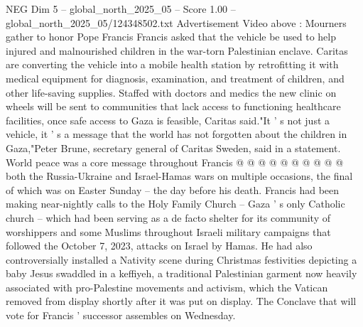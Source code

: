 \begin{textsample}{NEG Dim 5 – global\_north\_2025\_05 – Score 1.00 – global\_north\_2025\_05/124348502.txt}
Advertisement Video above : Mourners gather to honor Pope Francis Francis asked that the vehicle be used to help injured and malnourished children in the war-torn Palestinian enclave.
Caritas are converting the vehicle into a mobile health station by retrofitting it with medical equipment for diagnosis, examination, and treatment of children, and other life-saving supplies.
Staffed with doctors and medics the new clinic on wheels will be sent to communities that lack access to functioning healthcare facilities, once safe access to Gaza is feasible, Caritas said."It ' s not just a vehicle, it ' s a message that the world has not forgotten about the children in Gaza,"Peter Brune, secretary general of Caritas Sweden, said in a statement.
World peace was a core message throughout Francis @ @ @ @ @ @ @ @ @ @ both the Russia-Ukraine and Israel-Hamas wars on multiple occasions, the final of which was on Easter Sunday -- the day before his death.
Francis had been making near-nightly calls to the Holy Family Church -- Gaza ' s only Catholic church -- which had been serving as a de facto shelter for its community of worshippers and some Muslims throughout Israeli military campaigns that followed the October 7, 2023, attacks on Israel by Hamas.
He had also controversially installed a Nativity scene during Christmas festivities depicting a baby Jesus swaddled in a keffiyeh, a traditional Palestinian garment now heavily associated with pro-Palestine movements and activism, which the Vatican removed from display shortly after it was put on display.
The Conclave that will vote for Francis ' successor assembles on Wednesday.

\end{textsample}
